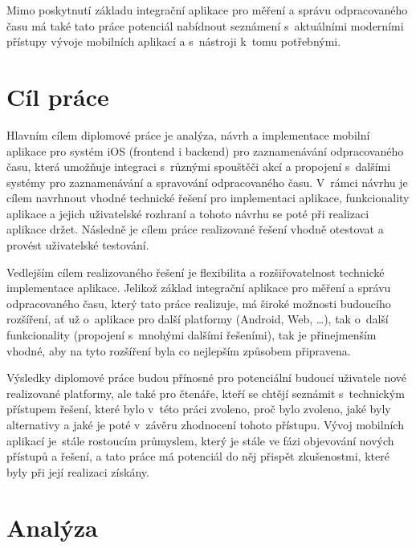 Mimo poskytnutí základu integrační aplikace pro měření a správu odpracovaného času má také tato práce potenciál nabídnout seznámení s~aktuálními moderními přístupy vývoje mobilních aplikací a s~nástroji k~tomu potřebnými.

\chapter{Cíl práce}

Hlavním cílem diplomové práce je analýza, návrh a implementace mobilní aplikace pro systém iOS (frontend i backend) pro zaznamenávání odpracovaného času, která umožňuje integraci s~různými spouštěči akcí a propojení s~dalšími systémy pro zaznamenávání a spravování odpracovaného času. V~rámci návrhu je cílem navrhnout vhodné technické řešení pro implementaci aplikace, funkcionality aplikace a jejich uživatelské rozhraní a tohoto návrhu se poté při realizaci aplikace držet. Následně je cílem práce realizované řešení vhodně otestovat a provést uživatelské testování. 

Vedlejším cílem realizovaného řešení je flexibilita a rozšiřovatelnost technické implementace aplikace. Jelikož základ integrační aplikace pro měření a správu odpracovaného času, který tato práce realizuje, má široké možnosti budoucího rozšíření, ať už o~aplikace pro další platformy (Android, Web, \dots), tak o~další funkcionality (propojení s~mnohými dalšími řešeními), tak je přinejmenším vhodné, aby na tyto rozšíření byla co nejlepším způsobem připravena.

Výsledky diplomové práce budou přínosné pro potenciální budoucí uživatele nové realizované platformy, ale také pro čtenáře, kteří se chtějí seznámit s~technickým přístupem řešení, které bylo v~této práci zvoleno, proč bylo zvoleno, jaké byly alternativy a jaké je poté v~závěru zhodnocení tohoto přístupu. Vývoj mobilních aplikací je~stále rostoucím průmyslem, který je stále ve fázi objevování nových přístupů a řešení, a tato práce má potenciál do něj přispět zkušenostmi, které byly při její realizaci získány.

\chapter{Analýza}

